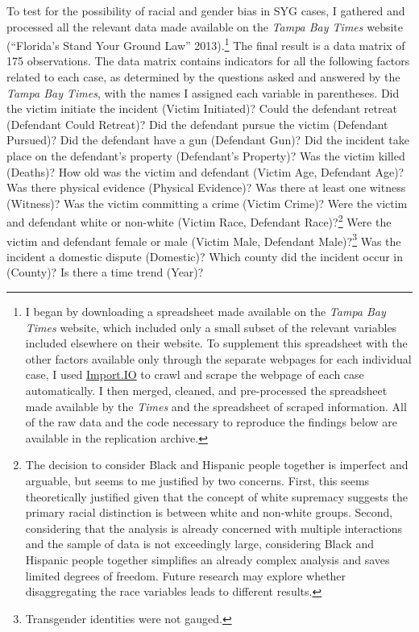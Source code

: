 \documentclass[12pt,article]{article}
\begin{document}
To test for the possibility of racial and gender bias in SYG cases, I
gathered and processed all the relevant data made available on the
\emph{Tampa Bay Times} website (``Florida's Stand Your Ground Law''
2013).\footnote{I began by downloading a spreadsheet made available on
  the \emph{Tampa Bay Times} website, which included only a small subset
  of the relevant variables included elsewhere on their website. To
  supplement this spreadsheet with the other factors available only
  through the separate webpages for each individual case, I used
  \href{http://import.io}{Import.IO} to crawl and scrape the webpage of
  each case automatically. I then merged, cleaned, and pre-processed the
  spreadsheet made available by the \emph{Times} and the spreadsheet of
  scraped information. All of the raw data and the code necessary to
  reproduce the findings below are available in the replication archive.}
The final result is a data matrix of 175 observations. The data matrix
contains indicators for all the following factors related to each case,
as determined by the questions asked and answered by the \emph{Tampa Bay
Times}, with the names I assigned each variable in parentheses. Did the
victim initiate the incident (Victim Initiated)? Could the defendant
retreat (Defendant Could Retreat)? Did the defendant pursue the victim
(Defendant Pursued)? Did the defendant have a gun (Defendant Gun)? Did
the incident take place on the defendant's property (Defendant's
Property)? Was the victim killed (Deaths)? How old was the victim and
defendant (Victim Age, Defendant Age)? Was there physical evidence
(Physical Evidence)? Was there at least one witness (Witness)? Was the
victim committing a crime (Victim Crime)? Were the victim and defendant
white or non-white (Victim Race, Defendant Race)?\footnote{The decision
  to consider Black and Hispanic people together is imperfect and
  arguable, but seems to me justified by two concerns. First, this seems
  theoretically justified given that the concept of white supremacy
  suggests the primary racial distinction is between white and non-white
  groups. Second, considering that the analysis is already concerned
  with multiple interactions and the sample of data is not exceedingly
  large, considering Black and Hispanic people together simplifies an
  already complex analysis and saves limited degrees of freedom. Future
  research may explore whether disaggregating the race variables leads
  to different results.} Were the victim and defendant female or male
(Victim Male, Defendant Male)?\footnote{Transgender identities were not
  gauged.} Was the incident a domestic dispute (Domestic)? Which county
did the incident occur in (County)? Is there a time trend (Year)?
\end{document}
